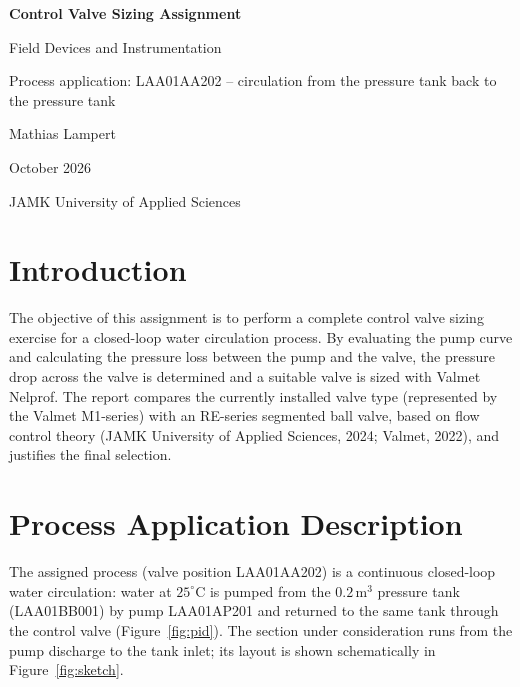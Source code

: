 \documentclass[11pt,a4paper]{article}
\begin{document}
\begin{titlepage}
\centering
\vspace*{3cm}
{\Huge\bfseries Control Valve Sizing Assignment\par}
\vspace{0.8cm}
{\Large Field Devices and Instrumentation\par}
\vspace{0.5cm}
{\large Process application: LAA01AA202 -- circulation from the pressure tank back to the pressure tank\par}
\vspace{3cm}
{\large Mathias Lampert\par}
\vspace{0.5cm}
{\large October 2026\par}
\vfill
{\small JAMK University of Applied Sciences}
\end{titlepage}

\tableofcontents
\clearpage
\listoffigures
\listoftables
\clearpage

\section{Introduction}
The objective of this assignment is to perform a complete control valve sizing exercise for a closed-loop water circulation process. By evaluating the pump curve and calculating the pressure loss between the pump and the valve, the pressure drop across the valve is determined and a suitable valve is sized with Valmet Nelprof. The report compares the currently installed valve type (represented by the Valmet M1-series) with an RE-series segmented ball valve, based on flow control theory (JAMK University of Applied Sciences, 2024; Valmet, 2022), and justifies the final selection.

\section{Process Application Description}
The assigned process (valve position LAA01AA202) is a continuous closed-loop water circulation: water at $25^\circ\text{C}$ is pumped from the $0.2\,\text{m}^3$ pressure tank (LAA01BB001) by pump LAA01AP201 and returned to the same tank through the control valve (Figure~\ref{fig:pid}). The section under consideration runs from the pump discharge to the tank inlet; its layout is shown schematically in Figure~\ref{fig:sketch}.
\end{document}
